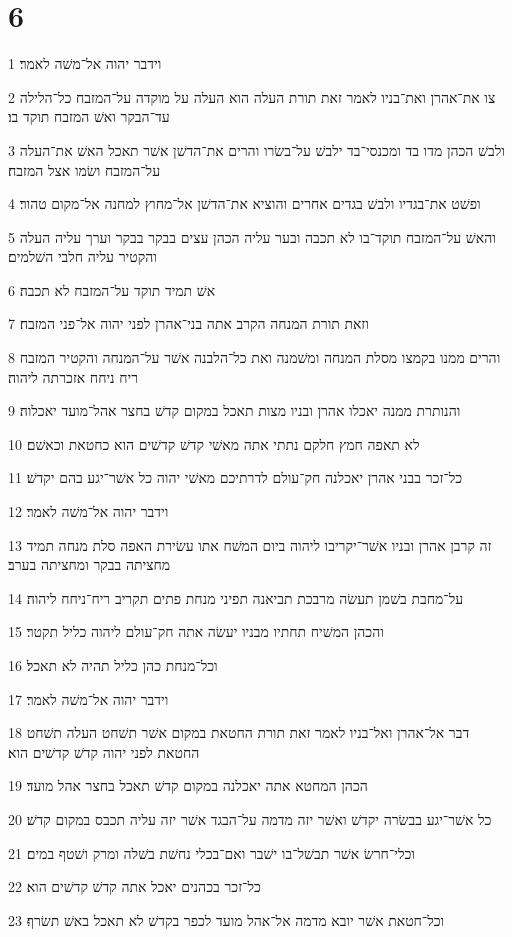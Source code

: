 \chapter{6}

\par 1 וידבר יהוה אל־משׁה לאמר׃
\par 2 צו את־אהרן ואת־בניו לאמר זאת תורת העלה הוא העלה על מוקדה על־המזבח כל־הלילה עד־הבקר ואשׁ המזבח תוקד בו׃
\par 3 ולבשׁ הכהן מדו בד ומכנסי־בד ילבשׁ על־בשׂרו והרים את־הדשׁן אשׁר תאכל האשׁ את־העלה על־המזבח ושׂמו אצל המזבח׃
\par 4 ופשׁט את־בגדיו ולבשׁ בגדים אחרים והוציא את־הדשׁן אל־מחוץ למחנה אל־מקום טהור׃
\par 5 והאשׁ על־המזבח תוקד־בו לא תכבה ובער עליה הכהן עצים בבקר בבקר וערך עליה העלה והקטיר עליה חלבי השׁלמים׃
\par 6 אשׁ תמיד תוקד על־המזבח לא תכבה׃
\par 7 וזאת תורת המנחה הקרב אתה בני־אהרן לפני יהוה אל־פני המזבח׃
\par 8 והרים ממנו בקמצו מסלת המנחה ומשׁמנה ואת כל־הלבנה אשׁר על־המנחה והקטיר המזבח ריח ניחח אזכרתה ליהוה׃
\par 9 והנותרת ממנה יאכלו אהרן ובניו מצות תאכל במקום קדשׁ בחצר אהל־מועד יאכלוה׃
\par 10 לא תאפה חמץ חלקם נתתי אתה מאשׁי קדשׁ קדשׁים הוא כחטאת וכאשׁם׃
\par 11 כל־זכר בבני אהרן יאכלנה חק־עולם לדרתיכם מאשׁי יהוה כל אשׁר־יגע בהם יקדשׁ׃
\par 12 וידבר יהוה אל־משׁה לאמר׃
\par 13 זה קרבן אהרן ובניו אשׁר־יקריבו ליהוה ביום המשׁח אתו עשׂירת האפה סלת מנחה תמיד מחציתה בבקר ומחציתה בערב׃
\par 14 על־מחבת בשׁמן תעשׂה מרבכת תביאנה תפיני מנחת פתים תקריב ריח־ניחח ליהוה׃
\par 15 והכהן המשׁיח תחתיו מבניו יעשׂה אתה חק־עולם ליהוה כליל תקטר׃
\par 16 וכל־מנחת כהן כליל תהיה לא תאכל׃
\par 17 וידבר יהוה אל־משׁה לאמר׃
\par 18 דבר אל־אהרן ואל־בניו לאמר זאת תורת החטאת במקום אשׁר תשׁחט העלה תשׁחט החטאת לפני יהוה קדשׁ קדשׁים הוא׃
\par 19 הכהן המחטא אתה יאכלנה במקום קדשׁ תאכל בחצר אהל מועד׃
\par 20 כל אשׁר־יגע בבשׂרה יקדשׁ ואשׁר יזה מדמה על־הבגד אשׁר יזה עליה תכבס במקום קדשׁ׃
\par 21 וכלי־חרשׂ אשׁר תבשׁל־בו ישׁבר ואם־בכלי נחשׁת בשׁלה ומרק ושׁטף במים׃
\par 22 כל־זכר בכהנים יאכל אתה קדשׁ קדשׁים הוא׃
\par 23 וכל־חטאת אשׁר יובא מדמה אל־אהל מועד לכפר בקדשׁ לא תאכל באשׁ תשׂרף׃


